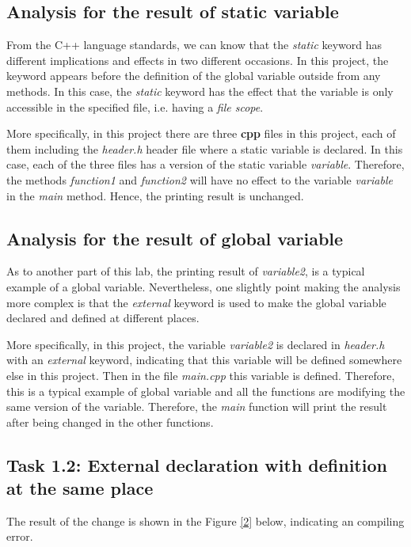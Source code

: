 \documentclass[a4paper]{report}
\begin{document}
\subsection{Analysis for the result of static variable}
From the C++ language standards, we can know that the \emph{static} keyword has different implications and effects in two different occasions. In this project, the keyword appears before the definition of the global variable outside from any methods. In this case, the \emph{static} keyword has the effect that the variable is only accessible in the specified file, i.e. having a \emph{file scope}.
\par
More specifically, in this project there are three \textbf{cpp} files in this project, each of them including the \emph{header.h} header file where a static variable is declared. In this case, each of the three files has a version of the static variable \emph{variable}. Therefore, the methods \emph{function1} and \emph{function2} will have no effect to the variable \emph{variable} in the \emph{main} method. Hence, the printing result is unchanged.

\subsection{Analysis for the result of global variable}
As to another part of this lab, the printing result of \emph{variable2}, is a typical example of a global variable. Nevertheless, one slightly point making the analysis more complex is that the \emph{external} keyword is used to make the global variable declared and defined at different places. 
\par
More specifically, in this project, the variable \emph{variable2} is declared in \emph{header.h} with an \emph{external} keyword, indicating that this variable will be defined somewhere else in this project. Then in the file \emph{main.cpp} this variable is defined. Therefore, this is a typical example of global variable and all the functions are modifying the same version of the variable. Therefore, the \emph{main} function will print the result after being changed in the other functions.

\subsection{Task 1.2: External declaration with definition at the same place}
The result of the change is shown in the Figure \ref{2} below, indicating an compiling error.
\end{document}
